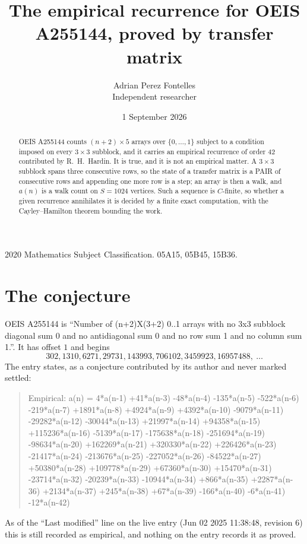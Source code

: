 \documentclass[11pt,a4paper]{article}
\title{The empirical recurrence for OEIS A255144, proved by transfer matrix}
\author{Adrian Perez Fontelles\\ \small Independent researcher}
\date{1 September 2026}
\theoremstyle{plain}
\theoremstyle{definition}
\begin{document}
\maketitle

\begin{abstract}
OEIS A255144 counts $(n+2)\times5$ arrays over $\{0,\dots,1\}$ subject to a condition imposed on
every $3\times3$ subblock, and it carries an empirical recurrence of order $42$
contributed by R.~H.~Hardin. It is true, and it is not an empirical matter. A $3\times3$
subblock spans three consecutive rows, so the state of a transfer matrix is a PAIR of
consecutive rows and appending one more row is a step; an array is then a walk, and
$a(n)$ is a walk count on $S=1024$ vertices. Such a sequence is $C$-finite, so whether a given
recurrence annihilates it is decided by a finite exact computation, with the Cayley--Hamilton
theorem bounding the work.
\end{abstract}

\noindent\small 2020 Mathematics Subject Classification. 05A15, 05B45, 15B36.\normalsize

\section{The conjecture}

OEIS A255144 is ``Number of (n+2)X(3+2) 0..1 arrays with no 3x3 subblock diagonal sum 0 and no antidiagonal sum 0 and no row sum 1 and no column sum 1.''. It has offset $1$ and begins
\[
302, 1310, 6271, 29731, 143993, 706102, 3459923, 16957488,\ \dots
\]
The entry states, as a conjecture contributed by its author and never marked settled:
\begin{quote}
Empirical: a(n) = 4*a(n-1) +41*a(n-3) -48*a(n-4) -135*a(n-5) -522*a(n-6) -219*a(n-7) +1891*a(n-8) +4924*a(n-9) +4392*a(n-10) -9079*a(n-11) -29282*a(n-12) -30044*a(n-13) +21997*a(n-14) +94358*a(n-15) +115236*a(n-16) -5139*a(n-17) -175638*a(n-18) -251694*a(n-19) -98634*a(n-20) +162269*a(n-21) +320330*a(n-22) +226426*a(n-23) -21417*a(n-24) -213676*a(n-25) -227052*a(n-26) -84522*a(n-27) +50380*a(n-28) +109778*a(n-29) +67360*a(n-30) +15470*a(n-31) -23714*a(n-32) -20239*a(n-33) -10944*a(n-34) +866*a(n-35) +2287*a(n-36) +2134*a(n-37) +245*a(n-38) +67*a(n-39) -166*a(n-40) -6*a(n-41) -12*a(n-42)
\end{quote}
As of the ``Last modified'' line on the live entry (Jun 02 2025 11:38:48, revision 6) this is still
recorded as empirical, and nothing on the entry records it as proved.
\end{document}

